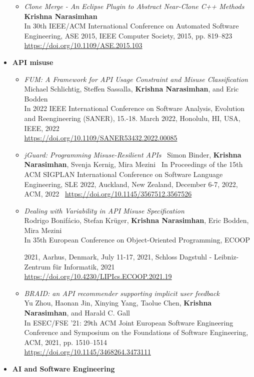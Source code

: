 \begin{itemize}
\begin{itemize}
\item \emph{Clone Merge - An Eclipse Plugin to Abstract Near-Clone C++ Methods} \\
\textbf{Krishna Narasimhan} \\
In 30th IEEE/ACM International Conference on Automated Software Engineering, ASE 2015, IEEE Computer Society, 2015, pp. 819--823 \\
\url{https://doi.org/10.1109/ASE.2015.103}
\end{itemize}


\item \textbf{API misuse}
\begin{itemize}

\item \emph{FUM: A Framework for API Usage Constraint and Misuse Classification} \\
Michael Schlichtig, Steffen Sassalla, \textbf{Krishna Narasimhan}, and Eric Bodden \\
In  2022 IEEE International Conference on Software Analysis, Evolution and Reengineering (SANER), 15.-18. March 2022, Honolulu, HI, USA,  IEEE, 2022 \\
\url{https://doi.org/10.1109/SANER53432.2022.00085}

\item \emph{jGuard: Programming Misuse-Resilient APIs} \
Simon Binder, \textbf{Krishna Narasimhan}, Svenja Kernig, Mira Mezini \
In Proceedings of the 15th ACM SIGPLAN International Conference on Software Language Engineering, SLE 2022, Auckland, New Zealand, December 6-7, 2022, ACM, 2022 \
\url{https://doi.org/10.1145/3567512.3567526}

\item \emph{Dealing with Variability in API Misuse Specification} \\
Rodrigo Bonifácio, Stefan Krüger, \textbf{Krishna Narasimhan}, Eric Bodden, Mira Mezini \\
In 35th European Conference on Object-Oriented Programming, ECOOP 

2021, Aarhus, Denmark, July 11-17, 2021, Schloss Dagstuhl - Leibniz-Zentrum für Informatik, 2021 \\
\url{https://doi.org/10.4230/LIPIcs.ECOOP.2021.19}

\item \emph{BRAID: an API recommender supporting implicit user feedback} \\
Yu Zhou, Haonan Jin, Xinying Yang, Taolue Chen, \textbf{Krishna Narasimhan}, and Harald C. Gall \\
In ESEC/FSE '21: 29th ACM Joint European Software Engineering Conference and Symposium on the Foundations of Software Engineering, ACM, 2021, pp. 1510--1514 \\
\url{https://doi.org/10.1145/3468264.3473111}
\end{itemize}
\item \textbf{AI and Software Engineering}


\end{itemize}

